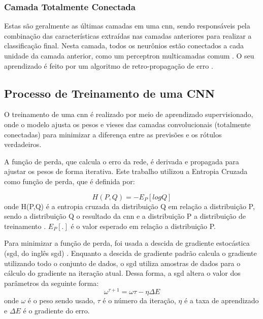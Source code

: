 \subsubsection{Camada Totalmente Conectada}

Estas são geralmente as últimas camadas em uma \acrshort{cnn}, sendo responsáveis pela combinação das características extraídas nas camadas anteriores para realizar a classificação final. 
Nesta camada, todos os neurônios estão conectados a cada unidade da camada anterior, como um perceptron multicamadas comum \cite{MURTAGH1991183}. 
O seu aprendizado é feito por um algoritmo de retro-propagação de erro \cite{Rumelhart1986LearningRB}.
\subsection{Processo de Treinamento de uma CNN}

O treinamento de uma \acrshort{cnn} é realizado por meio de aprendizado supervisionado, onde o modelo ajusta os pesos e vieses das camadas convolucionais (totalmente conectadas) para minimizar a diferença entre as previsões e os rótulos verdadeiros.

A função de perda, que calcula o erro da rede, é derivada e propagada para ajustar os pesos de forma iterativa. 
Este trabalho utilizou a Entropia Cruzada como função de perda, que é definida por:

\begin{equation}
    \label{eqn:crossentropy}
    H(P,Q) = -E_{P}[log Q]
\end{equation}
onde H(P,Q) é a entropia cruzada da distribuição Q em relação a distribuição P, sendo a distribuição Q o resultado da \acrshort{cnn} e a distribuição P a distribuição de treinamento \cite{mao2023}. 
$E_{P}[.]$ é o valor esperado em relação a distribuição P.

Para minimizar a função de perda, foi usada a descida de gradiente estocástica (\acrshort{sgd}, do inglês \acrlong{sgd}) \cite{ruder2016}. Enquanto a descida de gradiente padrão calcula o gradiente utilizando todo o conjunto de dados, o \acrshort{sgd} utiliza amostras de dados para o cálculo do gradiente na iteração atual.
Dessa forma, a \acrshort{sgd} altera o valor dos parâmetros da seguinte forma:
\begin{equation}
    \label{eqn:sgd}
    \omega^{\tau+1} = \omega{\tau} - \eta\Delta{E}
\end{equation}
onde $\omega$ é o peso sendo usado, $\tau$ é o número da iteração, $\eta$ é a taxa de aprendizado e $\Delta{E}$ é o gradiente do erro.

